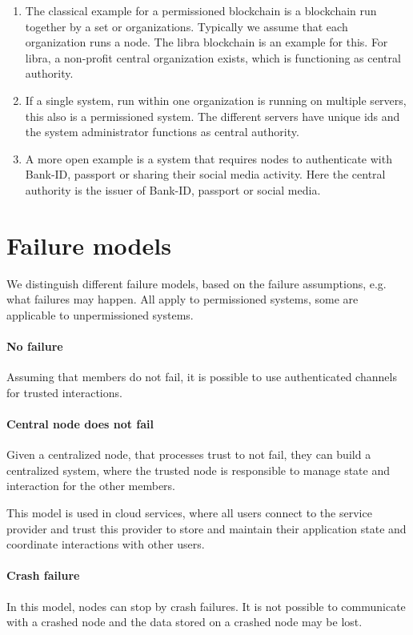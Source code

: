 \begin{example}
	\begin{enumerate}
		\item The classical example for a permissioned blockchain is a blockchain run together by a set or organizations. Typically we assume that each organization runs a node. The libra blockchain is an example for this. For libra, a non-profit central organization exists, which is functioning as central authority.
		\item If a single system, run within one organization is running on multiple servers, this also is a permissioned system. The different servers have unique ids and the system administrator functions as central authority.
		\item A more open example is a system that requires nodes to authenticate with Bank-ID, passport or sharing their social media activity. 
		Here the central authority is the issuer of Bank-ID, passport or social media.
	\end{enumerate}
\end{example}


\section{Failure models}
We distinguish different failure models, based on the failure assumptions, e.g. what failures may happen.
All apply to permissioned systems, some are applicable to unpermissioned systems.

\paragraph{No failure}
Assuming that members do not fail, it is possible to use authenticated channels for trusted interactions.

\paragraph{Central node does not fail}
Given a centralized node, that processes trust to not fail, they can build a centralized system, where the trusted node is responsible to manage state and interaction for the other members.

This model is used in cloud services, where all users connect to the service provider and trust this provider to store and maintain their application state and coordinate interactions with other users.

\paragraph{Crash failure}
In this model, nodes can stop by crash failures. It is not possible to communicate with a crashed node and the data stored on a crashed node may be lost.

